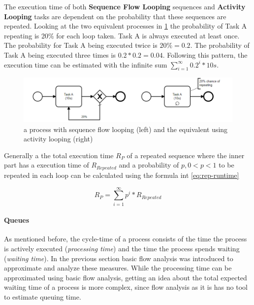 \begin{itemize}
	The execution time of both \textbf{Sequence Flow Looping} sequences and \textbf{Activity Looping} tasks are dependent on the probability that these sequences are repeated. Looking at the two equivalent processes in \ref{fig:repeated-example} the probability of Task A repeating is 20\% for each loop taken. Task A is always executed at least once. The probability for Task A being executed twice is $20\% = 0.2$. The probability of Task A being executed three times is $0.2 * 0.2 = 0.04$. Following this pattern, the execution time can be estimated with the infinite sum $\displaystyle\sum_{i=1}^{\infty} 0.2^i * 10s$.
	

	\begin{figure}[H]
		\centering
		\includegraphics[width=0.9\columnwidth]{graphics/repeated-example}
		\caption{a process with sequence flow looping (left) and the equivalent using activity looping (right)} 
		\label{fig:repeated-example} 
	\end{figure}

	Generally a the total execution time  $R_P$ of a repeated sequence where the inner part has a execution time of $R_{Repeated}$ and a probability of $p, 0 < p < 1$  to be repeated in each loop can be calculated using the formula int \ref{eq:rep-runtime}
	
	\begin{equation}\label{eq:rep-runtime}
		R_P = \displaystyle\sum_{i=1}^{\infty} p^i * R_{Repeated}
	\end{equation}
\end{itemize}

%	



\paragraph{Queues}
As mentioned before, the \gls{cycle-time} of a process consists of the time the process is actively executed (\textit{processing time}) and the time the process spends waiting (\textit{waiting time}). In the previous section basic flow analysis was introduced to approximate and analyze these measures.  
While the processing time can be approximated using basic flow analysis, getting an idea about the total expected waiting time of a process is more complex, since flow analysis as it is has no tool to estimate queuing time. 

